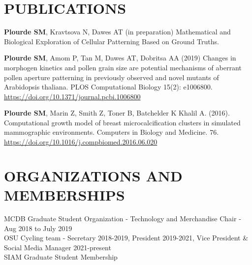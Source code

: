 \documentclass[10pt]{res} %
\begin{document}
\begin{resume}
\section{PUBLICATIONS}

    \textbf{Plourde SM}, Kravtsova N, Dawes AT (in preparation)  Mathematical and Biological Exploration of Cellular Patterning Based on Ground Truths.
    
    \textbf{Plourde SM}, Amom P, Tan M, Dawes AT, Dobritsa AA (2019) Changes in morphogen kinetics and pollen grain size are potential mechanisms of aberrant pollen aperture patterning in previously observed and novel mutants of Arabidopsis thaliana. PLOS Computational Biology 15(2): e1006800. \url{https://doi.org/10.1371/journal.pcbi.1006800}
    
    \textbf{Plourde SM}, Marin Z, Smith Z, Toner B, Batchelder K Khalil A. (2016). Computational growth model of breast microcalcification clusters in simulated mammographic environments. Computers in Biology and Medicine. 76. \url{https://doi.org/10.1016/j.compbiomed.2016.06.020}
          
    
          
\section{ORGANIZATIONS AND MEMBERSHIPS}
    MCDB Graduate Student Organization - Technology and Merchandise Chair - Aug 2018 to July 2019\\
    OSU Cycling team - Secretary 2018-2019, President 2019-2021, Vice President \& Social Media Manager 2021-present\\
    SIAM Graduate Student Membership

\end{resume} 
\end{document}
